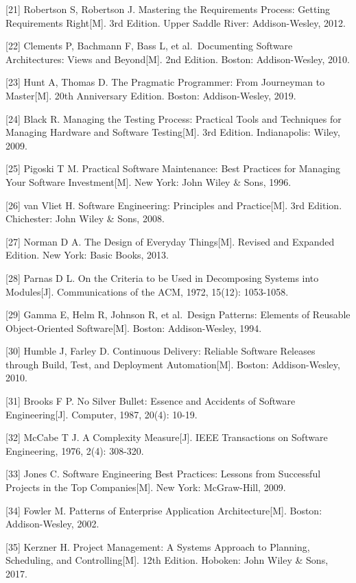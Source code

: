 {[}21{]} Robertson S, Robertson J. Mastering the Requirements Process:
Getting Requirements Right{[}M{]}. 3rd Edition. Upper Saddle River:
Addison-Wesley, 2012.

{[}22{]} Clements P, Bachmann F, Bass L, et al.~Documenting Software
Architectures: Views and Beyond{[}M{]}. 2nd Edition. Boston:
Addison-Wesley, 2010.

{[}23{]} Hunt A, Thomas D. The Pragmatic Programmer: From Journeyman to
Master{[}M{]}. 20th Anniversary Edition. Boston: Addison-Wesley, 2019.

{[}24{]} Black R. Managing the Testing Process: Practical Tools and
Techniques for Managing Hardware and Software Testing{[}M{]}. 3rd
Edition. Indianapolis: Wiley, 2009.

{[}25{]} Pigoski T M. Practical Software Maintenance: Best Practices for
Managing Your Software Investment{[}M{]}. New York: John Wiley \& Sons,
1996.

{[}26{]} van Vliet H. Software Engineering: Principles and
Practice{[}M{]}. 3rd Edition. Chichester: John Wiley \& Sons, 2008.

{[}27{]} Norman D A. The Design of Everyday Things{[}M{]}. Revised and
Expanded Edition. New York: Basic Books, 2013.

{[}28{]} Parnas D L. On the Criteria to be Used in Decomposing Systems
into Modules{[}J{]}. Communications of the ACM, 1972, 15(12): 1053-1058.

{[}29{]} Gamma E, Helm R, Johnson R, et al.~Design Patterns: Elements of
Reusable Object-Oriented Software{[}M{]}. Boston: Addison-Wesley, 1994.

{[}30{]} Humble J, Farley D. Continuous Delivery: Reliable Software
Releases through Build, Test, and Deployment Automation{[}M{]}. Boston:
Addison-Wesley, 2010.

{[}31{]} Brooks F P. No Silver Bullet: Essence and Accidents of Software
Engineering{[}J{]}. Computer, 1987, 20(4): 10-19.

{[}32{]} McCabe T J. A Complexity Measure{[}J{]}. IEEE Transactions on
Software Engineering, 1976, 2(4): 308-320.

{[}33{]} Jones C. Software Engineering Best Practices: Lessons from
Successful Projects in the Top Companies{[}M{]}. New York: McGraw-Hill,
2009.

{[}34{]} Fowler M. Patterns of Enterprise Application
Architecture{[}M{]}. Boston: Addison-Wesley, 2002.

{[}35{]} Kerzner H. Project Management: A Systems Approach to Planning,
Scheduling, and Controlling{[}M{]}. 12th Edition. Hoboken: John Wiley \&
Sons, 2017.

